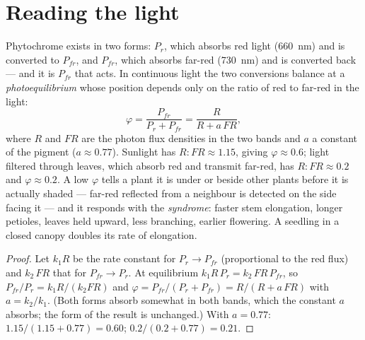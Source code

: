\section{Reading the light}

\begin{theorem}\label{thm:b2:plant-plasticity:phytochrome}
Phytochrome exists in two forms: $P_r$, which absorbs red light
(\qty{660}{nm}) and is converted to $P_{fr}$, and $P_{fr}$, which
absorbs far-red (\qty{730}{nm}) and is converted back --- and it is
$P_{fr}$ that acts. In continuous light the two conversions balance
at a \emph{photoequilibrium} whose position depends only on the
ratio of red to far-red in the light:
\[
\varphi = \frac{P_{fr}}{P_{r} + P_{fr}} = \frac{R}{R + a\,FR},
\]
where $R$ and $FR$ are the photon flux densities in the two bands
and $a$ a constant of the pigment ($a \approx 0.77$). Sunlight has
$R{:}FR \approx 1.15$, giving $\varphi \approx 0.6$; light filtered
through leaves, which absorb red and transmit far-red, has $R{:}FR
\approx 0.2$ and $\varphi \approx 0.2$. A low $\varphi$ tells a
plant it is under or beside other plants before it is actually
shaded --- far-red reflected from a neighbour is detected on the
side facing it --- and it responds with the \emph{
syndrome}: faster stem elongation, longer petioles, leaves held
upward, less branching, earlier flowering. A seedling in a closed
canopy doubles its rate of elongation.
\end{theorem}
\begin{proof}
Let $k_1 R$ be the rate constant for $P_r \to P_{fr}$ (proportional
to the red flux) and $k_2\,FR$ that for $P_{fr} \to P_r$. At
equilibrium $k_1 R\,P_r = k_2\,FR\,P_{fr}$, so $P_{fr}/P_r = k_1 R/
(k_2 FR)$ and $\varphi = P_{fr}/(P_r + P_{fr}) = R/(R + a\,FR)$ with
$a = k_2/k_1$. (Both forms absorb somewhat in both bands, which the
constant $a$ absorbs; the form of the result is unchanged.) With
$a = 0.77$: $1.15/(1.15 + 0.77) = 0.60$; $0.2/(0.2 + 0.77) = 0.21$.
\end{proof}

